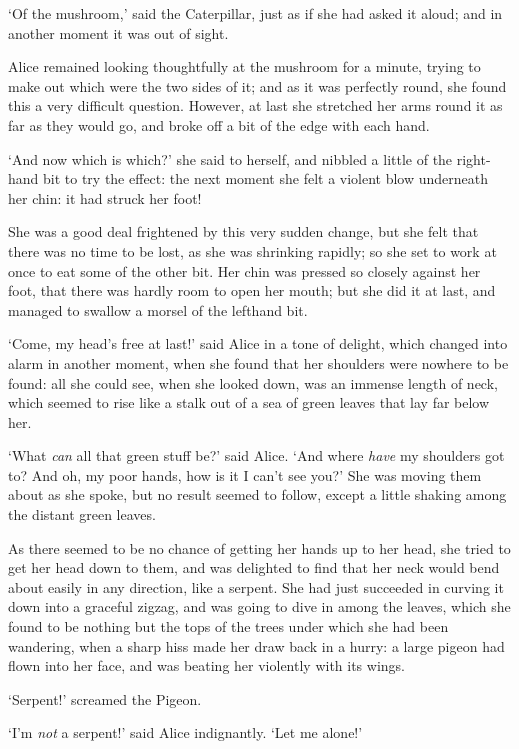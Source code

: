   `Of the mushroom,' said the Caterpillar, just as if she had
asked it aloud; and in another moment it was out of sight.

  Alice remained looking thoughtfully at the mushroom for a
minute, trying to make out which were the two sides of it; and as
it was perfectly round, she found this a very difficult question.
However, at last she stretched her arms round it as far as they
would go, and broke off a bit of the edge with each hand.

  `And now which is which?' she said to herself, and nibbled a
little of the right-hand bit to try the effect:  the next moment
she felt a violent blow underneath her chin:  it had struck her
foot!

  She was a good deal frightened by this very sudden change, but
she felt that there was no time to be lost, as she was shrinking
rapidly; so she set to work at once to eat some of the other bit.
Her chin was pressed so closely against her foot, that there was
hardly room to open her mouth; but she did it at last, and
managed to swallow a morsel of the lefthand bit.

  `Come, my head's free at last!' said Alice in a tone of
delight, which changed into alarm in another moment, when she
found that her shoulders were nowhere to be found:  all she could
see, when she looked down, was an immense length of neck, which
seemed to rise like a stalk out of a sea of green leaves that lay
far below her.

  `What {\it can} all that green stuff be?' said Alice.  `And where
{\it have} my shoulders got to?  And oh, my poor hands, how is it I
can't see you?'  She was moving them about as she spoke, but no
result seemed to follow, except a little shaking among the
distant green leaves.

  As there seemed to be no chance of getting her hands up to her
head, she tried to get her head down to them, and was delighted
to find that her neck would bend about easily in any direction,
like a serpent.  She had just succeeded in curving it down into a
graceful zigzag, and was going to dive in among the leaves, which
she found to be nothing but the tops of the trees under which she
had been wandering, when a sharp hiss made her draw back in a
hurry:  a large pigeon had flown into her face, and was beating
her violently with its wings.

  `Serpent!' screamed the Pigeon.

  `I'm {\it not} a serpent!' said Alice indignantly.  `Let me alone!'

